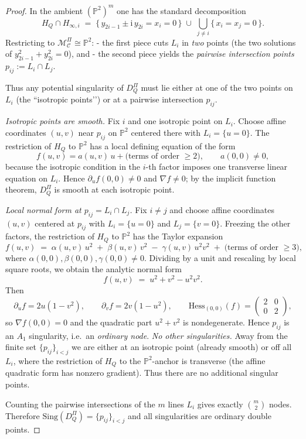 \documentclass{article}
\newcommand{\PP}{\mathbb{P}}
\begin{document}
\begin{proof}
\noindent
In the ambient $(\PP^2)^m$ one has the standard decomposition
\[
H_Q\cap H_{\infty,i}\;=\;\{\,y_{2i-1}\pm \mathrm{i}\,y_{2i}=x_i=0\,\}\;\cup\;\bigcup_{j\neq i}\{\,x_i=x_j=0\,\}.
\]
Restricting to $\mathcal M^\Pi_{\mathcal C}\cong\PP^2$:
- the first piece cuts $L_i$ in \emph{two} points (the two solutions of $y_{2i-1}^2+y_{2i}^2=0$), and
- the second piece yields the \emph{pairwise intersection points}~$p_{ij}:=L_i\cap L_j$.

Thus any potential singularity of $D_Q^\Pi$ must lie either at one of the two points on $L_i$ (the ``isotropic points’’) or at a pairwise intersection $p_{ij}$.

\smallskip
\noindent\textit{ Isotropic points are smooth.}
Fix $i$ and one isotropic point on $L_i$. Choose affine coordinates $(u,v)$ near \(p_{ij}\) on $\PP^2$ centered there with
$L_i=\{u=0\}$. The restriction of $H_Q$ to $\PP^2$ has a local defining
equation of the form
\[
f(u,v)=a(u,v)\,u+\text{(terms of order $\ge2$)},\qquad a(0,0)\neq0,
\]
because the isotropic condition in the $i$-th factor imposes one transverse linear equation on $L_i$.
Hence $\partial_u f(0,0)\neq0$ and $\nabla f\neq0$; by the implicit function theorem, $D_Q^\Pi$ is smooth
at each isotropic point.

\smallskip
\noindent\textit{ Local normal form at $p_{ij}=L_i\cap L_j$.}
Fix $i\neq j$ and choose affine coordinates $(u,v)$ centered at $p_{ij}$ with $L_i=\{u=0\}$ and
$L_j=\{v=0\}$. Freezing the other factors, the restriction of $H_Q$ to $\PP^2$ has the Taylor expansion
\[
f(u,v)\;=\;\alpha(u,v)\,u^2\;+\;\beta(u,v)\,v^2\;-\;\gamma(u,v)\,u^2v^2\;+\;\text{(terms of order }\ge3),
\]
where $\alpha(0,0),\beta(0,0),\gamma(0,0)\neq0$. Dividing by a unit and rescaling by local square roots, we obtain
the analytic normal form
\[
f(u,v)\;=\;u^2+v^2-u^2v^2.
\]
Then
\[
\partial_u f=2u(1-v^2),\qquad \partial_v f=2v(1-u^2),\qquad \mathrm{Hess}_{(0,0)}(f)=
\begin{pmatrix} 2 & 0\\ 0 & 2\end{pmatrix},
\]
so $\nabla f(0,0)=0$ and the quadratic part $u^2+v^2$ is nondegenerate. Hence $p_{ij}$ is an $A_1$ singularity,
i.e.\ an \emph{ordinary node}.
\smallskip
\noindent\textit{ No other singularities.}
Away from the finite set $\{p_{ij}\}_{i<j}$ we are either at an isotropic point (already smooth) or
off all $L_i$, where the restriction of $H_Q$ to the $\PP^2$-anchor is transverse (the affine quadratic form
has nonzero gradient). Thus there are no additional singular points.

\smallskip
Counting the pairwise intersections of the $m$ lines $L_i$ gives exactly $\binom{m}{2}$ nodes. Therefore
$\mathrm{Sing}(D_Q^\Pi)=\{p_{ij}\}_{i<j}$ and all singularities are ordinary double points.
\end{proof}
\end{document}
